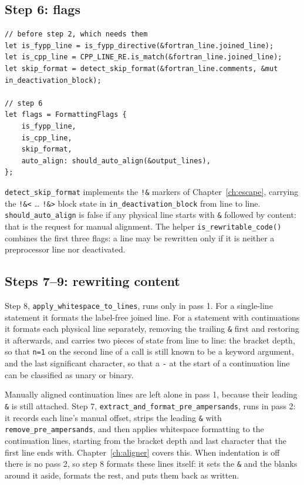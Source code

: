 \documentclass[11pt,a4paper,openany]{book}
\newcommand{\code}[1]{\texttt{\small #1}}
\begin{document}
\subsection{Step 6: flags}

\begin{lstlisting}[style=rust]
// before step 2, which needs them
let is_fypp_line = is_fypp_directive(&fortran_line.joined_line);
let is_cpp_line = CPP_LINE_RE.is_match(&fortran_line.joined_line);
let skip_format = detect_skip_format(&fortran_line.comments, &mut in_deactivation_block);

// step 6
let flags = FormattingFlags {
    is_fypp_line,
    is_cpp_line,
    skip_format,
    auto_align: should_auto_align(&output_lines),
};
\end{lstlisting}

\code{detect\_skip\_format} implements the \code{!\&} markers of
Chapter~\ref{ch:escape}, carrying the \code{!\&<} \ldots{} \code{!\&>} block
state in \code{in\_deactivation\_block} from line to line.
\code{should\_auto\_align} is false if any physical line starts with
\code{\&} followed by content: that is the request for manual alignment.
The helper \code{is\_rewritable\_code()} combines the first three flags: a
line may be rewritten only if it is neither a preprocessor line nor
deactivated.

\subsection{Steps 7--9: rewriting content}

Step 8, \code{apply\_whitespace\_to\_lines}, runs only in pass 1. For a
single-line statement it formats the label-free joined line. For a statement
with continuations it formats each physical line separately, removing the trailing
\code{\&} first and restoring it afterwards, and carries two pieces of state
from line to line: the bracket depth, so that \code{n=1} on the second line of
a call is still known to be a keyword argument, and the last significant
character, so that a \code{-} at the start of a continuation line can be
classified as unary or binary.

Manually aligned continuation lines are left alone in pass 1, because their
leading \code{\&} is still attached. Step 7,
\code{extract\_and\_format\_pre\_ampersands}, runs in pass 2: it records each
line's manual offset, strips the leading \code{\&} with
\code{remove\_pre\_ampersands}, and then applies whitespace formatting to the
continuation lines, starting from the bracket depth and last character that
the first line ends with. Chapter~\ref{ch:aligner} covers this. When
indentation is off there is no pass 2, so step 8 formats these lines itself:
it sets the \code{\&} and the blanks around it aside, formats the rest, and
puts them back as written.
\end{document}
